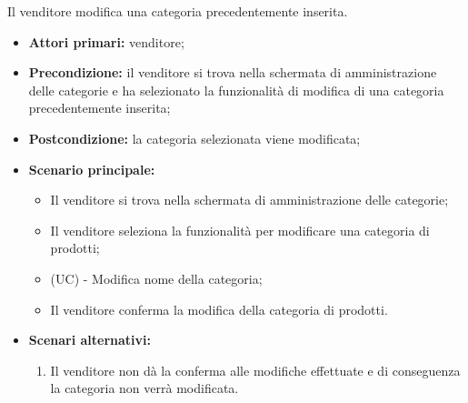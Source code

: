 Il venditore modifica una categoria precedentemente inserita.
\begin{itemize}
    \item \textbf{Attori primari:} venditore;
    \item \textbf{Precondizione:} il venditore si trova nella schermata di amministrazione delle categorie e ha selezionato la funzionalità di modifica di una categoria precedentemente inserita;
    \item \textbf{Postcondizione:} la categoria selezionata viene modificata;
    \item \textbf{Scenario principale:}
    \begin{itemize}
    	\item Il venditore si trova nella schermata di amministrazione delle categorie;
    	\item Il venditore seleziona la funzionalità per modificare una categoria di prodotti;
    	\item (UC) - Modifica nome della categoria;
    	\item Il venditore conferma la modifica della categoria di prodotti.
    \end{itemize}
    \item \textbf{Scenari alternativi:} 
    \begin{enumerate}[label=\lett]
    	\item Il venditore non dà la conferma alle modifiche effettuate e di conseguenza la categoria non verrà modificata.
    \end{enumerate}
\end{itemize}

\resetSubUC

